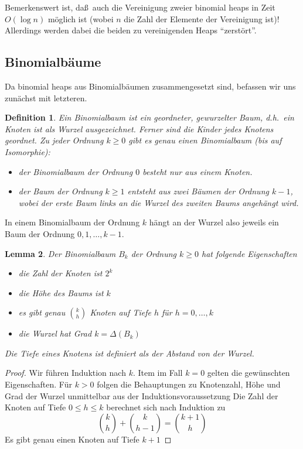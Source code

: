\documentclass[10pt,reqno]{amsart}
\numberwithin{equation}{section}
\newcommand\alert[1]{\emph{#1}}
\newtheorem{definition}{Definition}[section]
\newtheorem{lemma}[definition]{Lemma}
\begin{document}
Bemerkenswert ist, da\ss\ auch die Vereinigung zweier binomial heaps in Zeit $O(\log n)$ m\"oglich ist (wobei $n$ die Zahl der Elemente der Vereinigung ist)!
Allerdings werden dabei die beiden zu vereinigenden Heaps ``zerst\"ort''.

\subsection{Binomialb\"aume}\label{sec_binomial_trees}
Da binomial heaps aus Binomialb\"aumen zusammengesetzt sind, befassen wir uns zun\"achst mit letzteren.

\begin{definition}\label{def_binomial_tree}
	Ein Binomialbaum ist ein geordneter, gewurzelter Baum, d.h.\ ein Knoten ist als Wurzel ausgezeichnet.
	Ferner sind die Kinder jedes Knotens geordnet.
	Zu jeder \alert{Ordnung} $k\geq0$ gibt es genau einen Binomialbaum (bis auf Isomorphie):
	\begin{itemize}
		\item der Binomialbaum der Ordnung $0$ besteht nur aus einem Knoten.
		\item der Baum der Ordnung $k\geq1$ entsteht aus zwei B\"aumen der Ordnung $k-1$, wobei der erste Baum links an die Wurzel des zweiten Baums angeh\"angt wird.
	\end{itemize}
\end{definition}

\noindent
In einem Binomialbaum der Ordnung $k$ h\"angt an der Wurzel also jeweils ein Baum der Ordnung $0,1,\ldots,k-1$.

\begin{lemma}\label{lem_binomial_tree}
	Der Binomialbaum $B_k$ der Ordnung $k\geq0$ hat folgende Eigenschaften
	\begin{itemize}
		\item die Zahl der Knoten ist $2^k$
		\item die H\"ohe des Baums ist $k$
		\item es gibt genau $\binom kh$ Knoten auf Tiefe $h$ f\"ur $h=0,\ldots,k$
		\item die Wurzel hat Grad $k=\Delta(B_k)$
	\end{itemize}
	\itshape Die Tiefe eines Knotens ist definiert als der Abstand von der Wurzel.
\end{lemma}
\begin{proof}
	Wir f\"uhren Induktion nach $k$.
	Item im Fall $k=0$ gelten die gew\"unschten Eigenschaften.
	F\"ur $k>0$ folgen die Behauptungen zu Knotenzahl, H\"ohe und Grad der Wurzel unmittelbar aus der Induktionsvoraussetzung
	Die Zahl der Knoten auf Tiefe $0\leq h\leq k$ berechnet sich nach Induktion zu
	$$\binom kh+\binom k{h-1}=\binom{k+1}h$$
	Es gibt genau einen Knoten auf Tiefe $k+1$
\end{proof}
\end{document}
